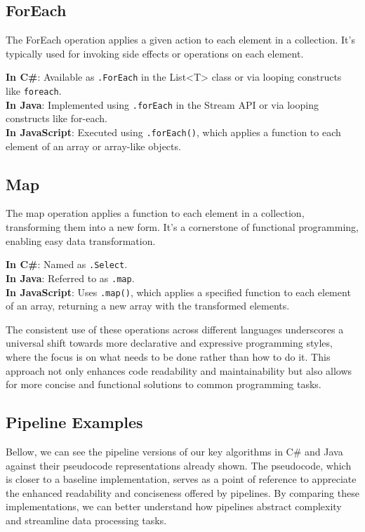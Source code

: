 \subsection*{ForEach}
The ForEach operation applies a given action to each element in a collection. It's typically used for invoking side effects or operations on each element.

\textbf{In C\#}: Available as \texttt{.ForEach} in the List<T> class or via looping constructs like \texttt{foreach}. \\
\textbf{In Java}: Implemented using \texttt{.forEach} in the Stream API or via looping constructs like for-each. \\
\textbf{In JavaScript}: Executed using \texttt{.forEach()}, which applies a function to each element of an array or array-like objects.

\subsection*{Map}
The map operation applies a function to each element in a collection, transforming them into a new form. It's a cornerstone of functional programming, enabling easy data transformation.

\textbf{In C\#}: Named as \texttt{.Select}. \\
\textbf{In Java}: Referred to as \texttt{.map}. \\
\textbf{In JavaScript}: Uses \texttt{.map()}, which applies a specified function to each element of an array, returning a new array with the transformed elements.

The consistent use of these operations across different languages underscores a universal shift towards more declarative and expressive programming styles, where the focus is on what needs to be done rather than how to do it. This approach not only enhances code readability and maintainability but also allows for more concise and functional solutions to common programming tasks.

\subsection{Pipeline Examples}
Bellow, we can see the pipeline versions of our key algorithms in C\# and Java against their pseudocode representations already shown. The pseudocode, which is closer to a baseline implementation, serves as a point of reference to appreciate the enhanced readability and conciseness offered by pipelines. By comparing these implementations, we can better understand how pipelines abstract complexity and streamline data processing tasks.

